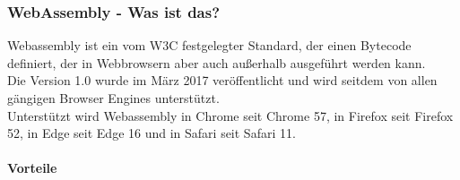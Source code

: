 \subsubsection{WebAssembly - Was ist das?}
Webassembly ist ein vom W3C festgelegter Standard, der einen Bytecode definiert, der in Webbrowsern aber auch außerhalb ausgeführt werden kann. \\
Die Version 1.0 wurde im März 2017 veröffentlicht und wird seitdem von allen gängigen Browser Engines unterstützt. \\
Unterstützt wird Webassembly in Chrome seit Chrome 57, in Firefox seit Firefox 52, in Edge seit Edge 16 und in Safari seit Safari 11. \\
\paragraph*{Vorteile}
